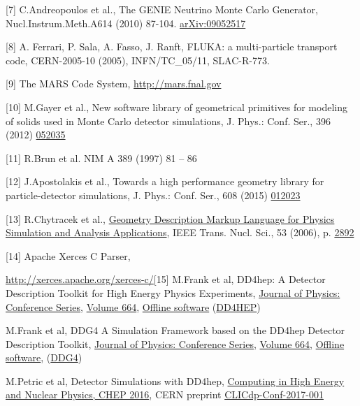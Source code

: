 \documentclass[12pt,a4paper]{article}
\begin{document}
{[}7{]} C.Andreopoulos et al., The GENIE Neutrino Monte Carlo Generator,
Nucl.Instrum.Meth.A614 (2010) 87-104.
\href{https://arxiv.org/abs/0905.2517}{{arXiv:09052517}}

{[}8{]} A. Ferrari, P. Sala, A. Fasso, J. Ranft, FLUKA: a multi-particle
transport code, CERN-2005-10 (2005), INFN/TC\_05/11, SLAC-R-773.

{[}9{]} The MARS Code System,
\href{http://mars.fnal.gov}{{http://mars.fnal.gov}}

{[}10{]} M.Gayer et al., New software library of geometrical primitives
for modeling of solids used in Monte Carlo detector simulations, J.
Phys.: Conf. Ser., 396 (2012)
\href{http://iopscience.iop.org/article/10.1088/1742-6596/396/5/052035/meta}{{052035}}

{[}11{]} R.Brun et al. NIM A 389 (1997) 81 -- 86

{[}12{]} J.Apostolakis et al., Towards a high performance geometry
library for particle-detector simulations, J. Phys.: Conf. Ser., 608
(2015)
\href{http://iopscience.iop.org/article/10.1088/1742-6596/608/1/012023}{{012023}}

{[}13{]} R.Chytracek et al.,
\href{http://ieeexplore.ieee.org/document/1710291/}{Geometry Description
Markup Language for Physics Simulation and Analysis Applications}, IEEE
Trans. Nucl. Sci., 53 (2006), p.
\href{http://ieeexplore.ieee.org/document/1710291/}{{2892}}

{[}14{]} Apache Xerces C Parser,

\href{http://xerces.apache.org/xerces-c/}{{http://xerces.apache.org/xerces-c/}}{[}15{]}
M.Frank et al, DD4hep: A Detector Description Toolkit for High Energy
Physics Experiments,
\href{http://iopscience.iop.org/journal/1742-6596}{{Journal of Physics:
Conference Series}},
\href{http://iopscience.iop.org/volume/1742-6596/664}{{Volume 664}},
\href{http://iopscience.iop.org/issue/1742-6596/664/7}{{Offline
software}}
(\href{http://iopscience.iop.org/article/10.1088/1742-6596/513/2/022010/meta}{{DD4HEP}})

M.Frank et al, DDG4 A Simulation Framework based on the DD4hep Detector
Description Toolkit,
\href{http://iopscience.iop.org/journal/1742-6596}{{Journal of Physics:
Conference Series}},
\href{http://iopscience.iop.org/volume/1742-6596/664}{{Volume 664}},
\href{http://iopscience.iop.org/issue/1742-6596/664/7}{{Offline
software}},
(\href{http://iopscience.iop.org/article/10.1088/1742-6596/664/7/072017/meta}{{DDG4}})

M.Petric et al, Detector Simulations with DD4hep,
\href{https://cds.cern.ch/record/2157890}{Computing in High Energy and
Nuclear Physics, CHEP 2016}, CERN preprint
\href{https://cds.cern.ch/record/2244362?ln=en}{{CLICdp-Conf-2017-001}}
\end{document}
